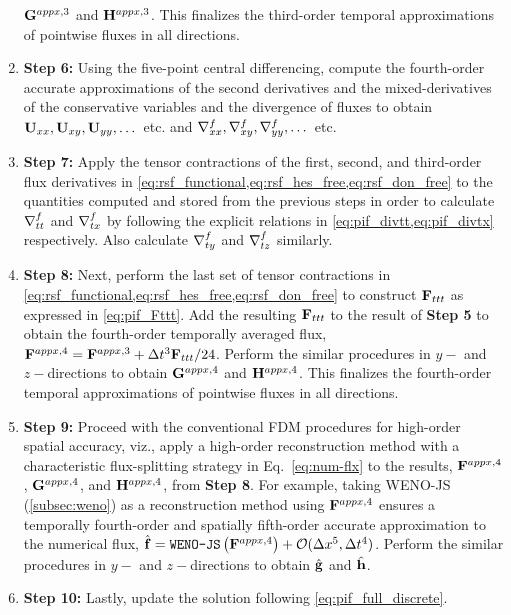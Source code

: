\begin{enumerate}
        \( \mathbf{G}^{appx,3}\) and \( \mathbf{H}^{appx,3}\).
        This finalizes the third-order temporal approximations of pointwise fluxes in all directions.
    \item[] \textbf{Step 6:}
        Using the five-point central differencing, 
        compute the fourth-order accurate approximations 
        of the second derivatives and the mixed-derivatives
        of the conservative variables and the divergence of fluxes
        to obtain
        \( \mathbf{U}_{xx}, \mathbf{U}_{xy}, \mathbf{U}_{yy}, \dots \) etc. and \( \nabla^{f}_{xx}, \nabla^{f}_{xy}, \nabla^{f}_{yy}, \dots \) etc.
    \item[] \textbf{Step 7:}
        Apply the tensor contractions of the first, second, and
        third-order flux derivatives in \cref{eq:rsf_functional,eq:rsf_hes_free,eq:rsf_don_free}
        to the quantities computed and stored from the previous steps in order to 
        calculate \( \nabla^{f}_{tt} \) and \( \nabla^{f}_{tx} \)
        by following the explicit relations in \cref{eq:pif_divtt,eq:pif_divtx} respectively.
        Also calculate \( \nabla^{f}_{ty} \) and \( \nabla^{f}_{tz} \) similarly.
    \item[] \textbf{Step 8:}
        Next, perform the last set of tensor contractions
        in \cref{eq:rsf_functional,eq:rsf_hes_free,eq:rsf_don_free}
        to construct \( \mathbf{F}_{ttt} \) as expressed in \cref{eq:pif_Fttt}.
        Add the resulting \( \mathbf{F}_{ttt} \) to the result of \textbf{Step 5} to obtain the fourth-order
        temporally averaged flux,
        \( \mathbf{F}^{appx,4} = \mathbf{F}^{appx,3} + \Delta t^{3} \mathbf{F}_{ttt}/24 \).
        Perform the similar procedures in \( y- \) and \( z- \)directions to obtain
        \( \mathbf{G}^{appx,4}\) and \( \mathbf{H}^{appx,4}\).
        This finalizes the fourth-order temporal approximations of pointwise fluxes in all directions.
    \item[] \textbf{Step 9:}
        Proceed with the conventional FDM procedures for high-order spatial accuracy, viz.,
        apply a high-order reconstruction method with a characteristic flux-splitting strategy
        in Eq.~\eqref{eq:num-flx}
        to the results, \( \mathbf{F}^{appx,4}\), \( \mathbf{G}^{appx,4}\), and \( \mathbf{H}^{appx,4}\),
        from \textbf{Step 8}. For example, taking WENO-JS (\cref{subsec:weno}) as a reconstruction method using
        \( \mathbf{F}^{appx, 4} \) ensures a temporally fourth-order 
        and spatially fifth-order accurate approximation to the numerical flux,
        \( \hat{\mathbf{f}} = \texttt{WENO-JS} \left ( \mathbf{F}^{appx,4} \right) + \mathcal{O}(\Delta x^{5},\Delta t^{4}) \).
        Perform the similar procedures in \( y- \) and \( z- \)directions to obtain
        \( \hat{\mathbf{g}}\) and \( \hat{\mathbf{h}}\).
    \item[] \textbf{Step 10:}
        Lastly, update the solution following \cref{eq:pif_full_discrete}.
\end{enumerate}



